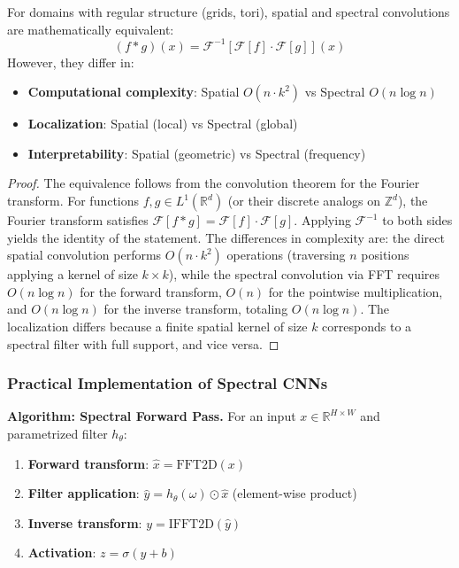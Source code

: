 \begin{theorem}\label{thm:equivalencia_espacial_espectral}
For domains with regular structure (grids, tori), spatial and spectral convolutions are mathematically equivalent:
\begin{equation}
(f * g)(x) = \mathcal{F}^{-1}[\mathcal{F}[f] \cdot \mathcal{F}[g]](x)
\end{equation}
However, they differ in:
\begin{itemize}
    \item \textbf{Computational complexity}: Spatial $O(n \cdot k^2)$ vs Spectral $O(n \log n)$
    \item \textbf{Localization}: Spatial (local) vs Spectral (global)
    \item \textbf{Interpretability}: Spatial (geometric) vs Spectral (frequency)
\end{itemize}
\end{theorem}

\begin{proof}
The equivalence follows from the convolution theorem for the Fourier transform. For functions $f, g \in L^1(\mathbb{R}^d)$ (or their discrete analogs on $\mathbb{Z}^d$), the Fourier transform satisfies $\mathcal{F}[f * g] = \mathcal{F}[f] \cdot \mathcal{F}[g]$. Applying $\mathcal{F}^{-1}$ to both sides yields the identity of the statement. The differences in complexity are: the direct spatial convolution performs $O(n \cdot k^2)$ operations (traversing $n$ positions applying a kernel of size $k \times k$), while the spectral convolution via FFT requires $O(n \log n)$ for the forward transform, $O(n)$ for the pointwise multiplication, and $O(n \log n)$ for the inverse transform, totaling $O(n \log n)$. The localization differs because a finite spatial kernel of size $k$ corresponds to a spectral filter with full support, and vice versa.
\end{proof}

\subsubsection{Practical Implementation of Spectral CNNs}

\textbf{Algorithm: Spectral Forward Pass.}\label{alg:forward_espectral} For an input $x \in \mathbb{R}^{H \times W}$ and parametrized filter $h_\theta$:
\begin{enumerate}
    \item \textbf{Forward transform}: $\hat{x} = \text{FFT2D}(x)$
    \item \textbf{Filter application}: $\hat{y} = h_\theta(\omega) \odot \hat{x}$ (element-wise product)
    \item \textbf{Inverse transform}: $y = \text{IFFT2D}(\hat{y})$
    \item \textbf{Activation}: $z = \sigma(y + b)$
\end{enumerate}

